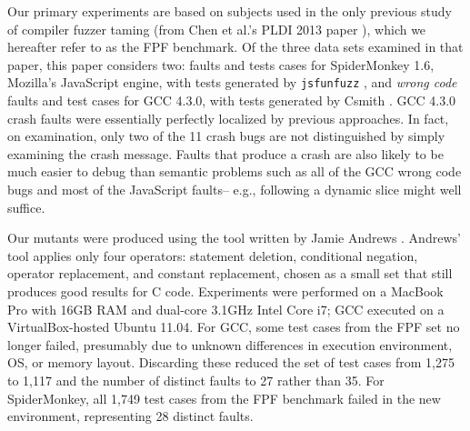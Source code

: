



Our primary experiments are based on subjects used in the only previous study of compiler fuzzer taming (from Chen et al.'s PLDI 2013 paper \cite{PLDI13}), which we hereafter refer to as the FPF benchmark.  Of the three data sets examined in that paper, this paper considers two:  faults and tests cases for SpiderMonkey 1.6, Mozilla's JavaScript engine, with tests generated by {\tt jsfunfuzz} \cite{jsfunfuzz}, and \emph{wrong code} faults and test cases for GCC 4.3.0, with tests generated by Csmith \cite{csmith}.  GCC 4.3.0 crash faults were essentially perfectly localized by previous approaches.  In fact, on examination, only two of the 11 crash bugs are not distinguished by simply examining the crash message.  Faults that produce a crash are also likely to be much easier to debug than semantic problems such as all of the GCC wrong code bugs and most of the JavaScript faults-- e.g., following a dynamic slice might well suffice.

Our mutants were produced using the tool written by Jamie Andrews \cite{mutant}.  Andrews' tool applies only four operators: statement deletion, conditional negation, operator replacement, and constant replacement, chosen as a small set that still produces good results for C code.  Experiments were performed on a MacBook Pro with 16GB RAM and dual-core 3.1GHz Intel Core i7; GCC executed on a VirtualBox-hosted Ubuntu 11.04.  For GCC, some test cases from the FPF set no longer failed, presumably due to unknown differences in execution environment, OS, or memory layout. Discarding these reduced the set of test cases from 1,275 to 1,117 and the number of distinct faults to 27 rather than 35.  For SpiderMonkey, all 1,749 test cases from the FPF benchmark failed in the new environment, representing 28 distinct faults.

